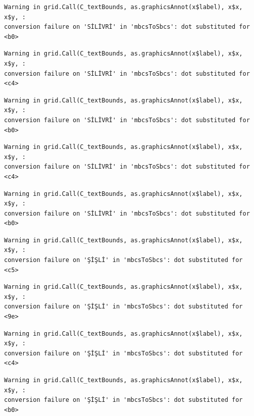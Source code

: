 \documentclass[
  11pt,
  a4paper,
  DIV=11,
  numbers=noendperiod]{scrartcl}
\begin{document}
\begin{verbatim}
Warning in grid.Call(C_textBounds, as.graphicsAnnot(x$label), x$x, x$y, :
conversion failure on 'SİLİVRİ' in 'mbcsToSbcs': dot substituted for <b0>
\end{verbatim}

\begin{verbatim}
Warning in grid.Call(C_textBounds, as.graphicsAnnot(x$label), x$x, x$y, :
conversion failure on 'SİLİVRİ' in 'mbcsToSbcs': dot substituted for <c4>
\end{verbatim}

\begin{verbatim}
Warning in grid.Call(C_textBounds, as.graphicsAnnot(x$label), x$x, x$y, :
conversion failure on 'SİLİVRİ' in 'mbcsToSbcs': dot substituted for <b0>
\end{verbatim}

\begin{verbatim}
Warning in grid.Call(C_textBounds, as.graphicsAnnot(x$label), x$x, x$y, :
conversion failure on 'SİLİVRİ' in 'mbcsToSbcs': dot substituted for <c4>
\end{verbatim}

\begin{verbatim}
Warning in grid.Call(C_textBounds, as.graphicsAnnot(x$label), x$x, x$y, :
conversion failure on 'SİLİVRİ' in 'mbcsToSbcs': dot substituted for <b0>
\end{verbatim}

\begin{verbatim}
Warning in grid.Call(C_textBounds, as.graphicsAnnot(x$label), x$x, x$y, :
conversion failure on 'ŞİŞLİ' in 'mbcsToSbcs': dot substituted for <c5>
\end{verbatim}

\begin{verbatim}
Warning in grid.Call(C_textBounds, as.graphicsAnnot(x$label), x$x, x$y, :
conversion failure on 'ŞİŞLİ' in 'mbcsToSbcs': dot substituted for <9e>
\end{verbatim}

\begin{verbatim}
Warning in grid.Call(C_textBounds, as.graphicsAnnot(x$label), x$x, x$y, :
conversion failure on 'ŞİŞLİ' in 'mbcsToSbcs': dot substituted for <c4>
\end{verbatim}

\begin{verbatim}
Warning in grid.Call(C_textBounds, as.graphicsAnnot(x$label), x$x, x$y, :
conversion failure on 'ŞİŞLİ' in 'mbcsToSbcs': dot substituted for <b0>
\end{verbatim}
\end{document}
